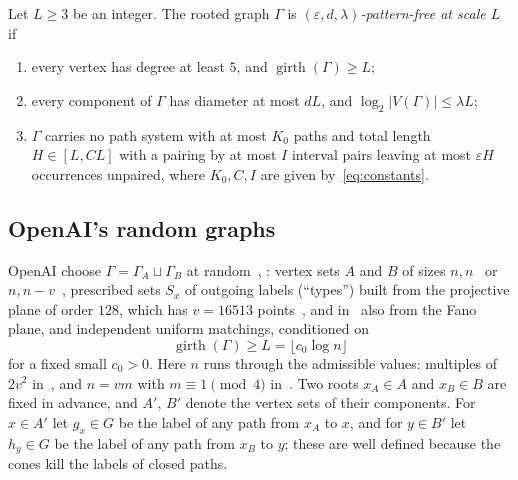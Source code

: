 \documentclass[11pt]{article}
\theoremstyle{definition}
\theoremstyle{plain}
\newcommand{\eps}{\varepsilon}
\newcommand{\girth}{\operatorname{girth}}
\begin{document}
\begin{definition}\label{def:patternfree}
Let $L\ge3$ be an integer. The rooted graph $\Gamma$ is \emph{$(\eps,d,\lambda)$-pattern-free at scale $L$} if
\begin{enumerate}[label=\textup{(P\arabic*)},itemsep=0pt]
\item every vertex has degree at least $5$, and $\girth(\Gamma)\ge L$;
\item every component of $\Gamma$ has diameter at most $dL$, and $\log_2|V(\Gamma)|\le\lambda L$;
\item $\Gamma$ carries no path system with at most $K_0$ paths and total length $H\in[L,CL]$ with a pairing by at most $I$ interval pairs leaving at most $\eps H$ occurrences unpaired, where $K_0,C,I$ are given by~\eqref{eq:constants}.
\end{enumerate}
\end{definition}

\subsection{OpenAI's random graphs}\label{sec:random}
OpenAI choose $\Gamma=\Gamma_A\sqcup\Gamma_B$ at random~\cite[\S2]{OAI196}, \cite[\S3]{OAI197a}: vertex sets $A$ and $B$ of sizes $n,n$~\cite{OAI196} or $n,n-v$~\cite{OAI197a}, prescribed sets $S_x$ of outgoing labels (``types'') built from the projective plane of order $128$, which has $v=16513$ points~\cite[\S2.1]{OAI196}, and in~\cite[\S3.1]{OAI197a} also from the Fano plane, and independent uniform matchings, conditioned on
\begin{equation}\label{eq:girth}
\girth(\Gamma)\ge L=\lfloor c_0\log n\rfloor
\end{equation}
for a fixed small $c_0>0$. Here $n$ runs through the admissible values: multiples of $2v^2$ in~\cite{OAI196}, and $n=vm$ with $m\equiv1\pmod 4$ in~\cite{OAI197a}. Two roots $x_A\in A$ and $x_B\in B$ are fixed in advance, and $A'$, $B'$ denote the vertex sets of their components. For $x\in A'$ let $g_x\in G$ be the label of any path from $x_A$ to $x$, and for $y\in B'$ let $h_y\in G$ be the label of any path from $x_B$ to $y$; these are well defined because the cones kill the labels of closed paths.
\end{document}
